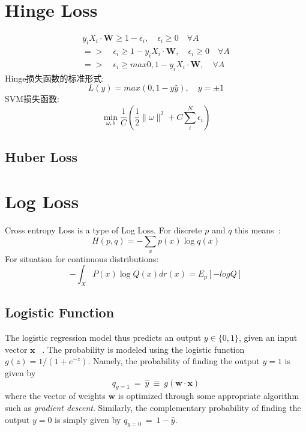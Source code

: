 \documentclass[hyperref, UTF-8]{ctexart}
\begin{document}
\section{Hinge Loss}
\begin{eqnarray*}
  y_i X_i \cdot \mathbf{W} \geq 1 - \epsilon{_i}, \quad \epsilon_i \geq 0 \quad
  \forall{A}  \\
  => \quad \epsilon_i \geq 1 - y_iX_i\cdot \mathbf{W}, \quad \epsilon_i \geq 0
  \quad \forall{A}  \\
  => \quad \epsilon_i \geq max{0, 1-y_iX_i\cdot\mathbf{W}}, \quad \forall{A}
\end{eqnarray*}
Hinge损失函数的标准形式: 
\begin{displaymath}
  L(y)= max(0, 1-y\hat{y}),\quad y=\pm{1}
\end{displaymath}
SVM损失函数:
\begin{displaymath}
  \min_{\omega,b}\frac{1}{C}\left( \frac{1}{2} \parallel\omega\parallel^2 + C
  \sum_{i}^N \epsilon_i \right)
\end{displaymath}
\subsection{Huber Loss}


\section{Log Loss}
Cross entropy Loss is a type of Log Loss.
For discrete $\mathit{p}$ and $\mathit{q}$ this means~\cite{logloss}:
\begin{displaymath}
  H(p, q) = - \sum_{x}p(x)\log{ q(x) }
\end{displaymath}
For situation for continuous distributions:
\begin{displaymath}
  -\int_XP(x)\log{Q(x)} dr(x) = E_p[-logQ]
\end{displaymath}

\subsection{Logistic Function}
The logistic regression model thus predicts an output $y \in \{0, 1\}$, given an
input vector $\mathbf {x}$ ~\cite{logloss}. The probability is modeled using the logistic function $g(z)=1/(1+e^{-z})$. Namely, the probability of finding the output  $y=1$ is given by
\begin{displaymath}
  q_{y=1}\ = \ \hat{y}\ \equiv \ g(\mathbf{w} \cdot \mathbf{x})
\end{displaymath}
where the vector of weights $\mathbf {w}$  is optimized through some appropriate
algorithm such as \emph{gradient descent}. Similarly, the complementary probability of
finding the output $y=0$ is simply given by $q_{{y=0}}\ =\ 1-{\hat  {y}}$.
\end{document}
